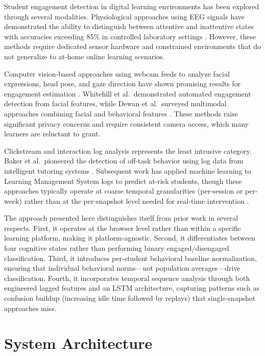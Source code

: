 \documentclass[conference]{IEEEtran}
\begin{document}
Student engagement detection in digital learning environments has been explored through several modalities. Physiological approaches using EEG signals have demonstrated the ability to distinguish between attentive and inattentive states with accuracies exceeding 85\% in controlled laboratory settings \cite{ref1}. However, these methods require dedicated sensor hardware and constrained environments that do not generalize to at-home online learning scenarios.

Computer vision-based approaches using webcam feeds to analyze facial expressions, head pose, and gaze direction have shown promising results for engagement estimation \cite{ref2}. Whitehill et al.\ demonstrated automated engagement detection from facial features, while Dewan et al.\ surveyed multimodal approaches combining facial and behavioral features \cite{ref3}. These methods raise significant privacy concerns and require consistent camera access, which many learners are reluctant to grant.

Clickstream and interaction log analysis represents the least intrusive category. Baker et al.\ pioneered the detection of off-task behavior using log data from intelligent tutoring systems \cite{ref4}. Subsequent work has applied machine learning to Learning Management System logs to predict at-risk students, though these approaches typically operate at coarse temporal granularities (per-session or per-week) rather than at the per-snapshot level needed for real-time intervention \cite{ref5}.

The approach presented here distinguishes itself from prior work in several respects. First, it operates at the browser level rather than within a specific learning platform, making it platform-agnostic. Second, it differentiates between four cognitive states rather than performing binary engaged/disengaged classification. Third, it introduces per-student behavioral baseline normalization, ensuring that individual behavioral norms---not population averages---drive classification. Fourth, it incorporates temporal sequence analysis through both engineered lagged features and an LSTM architecture, capturing patterns such as confusion buildup (increasing idle time followed by replays) that single-snapshot approaches miss.

\section{System Architecture}
\end{document}
